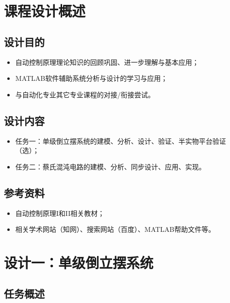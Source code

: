 \documentclass[UTF8]{article}
\begin{document}
\begin{titlepage}

\end{titlepage}

\tableofcontents
\cleardoublepage


%
\section{课程设计概述}
\subsection{设计目的}
\begin{itemize}
	\item 自动控制原理理论知识的回顾巩固、进一步理解与基本应用；
	\item MATLAB软件辅助系统分析与设计的学习与应用；
	\item 与自动化专业其它专业课程的对接/衔接尝试。
\end{itemize}


\subsection{设计内容}
\begin{itemize}
	\item 任务一：单级倒立摆系统的建模、分析、设计、验证、半实物平台验证（选）；
	\item 任务二：蔡氏混沌电路的建模、分析、同步设计、应用、实现。
\end{itemize}


\subsection{参考资料}
\begin{itemize}
	\item 自动控制原理I和II相关教材；
	\item 相关学术网站（知网）、搜索网站（百度）、MATLAB帮助文件等。
\end{itemize}


%
\section{设计一：单级倒立摆系统}
\subsection{任务概述}
\end{document}
